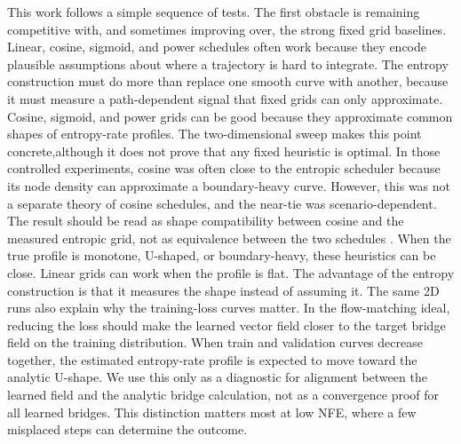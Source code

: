 \documentclass{article}
\theoremstyle{plain}
\theoremstyle{definition}
\theoremstyle{remark}
\begin{document}
This work follows a simple sequence of tests. The first obstacle is remaining competitive with, and sometimes improving over, the strong fixed grid baselines. Linear, cosine, sigmoid, and power schedules often work because they encode plausible assumptions about where a trajectory is hard to integrate. The entropy construction must do more than replace one smooth curve with another, because it must measure a path-dependent signal that fixed grids can only approximate. Cosine, sigmoid, and power grids can be good because they approximate common shapes of entropy-rate profiles. The two-dimensional sweep makes this point concrete,although it does not prove that any fixed heuristic is optimal. In those controlled experiments, cosine was often close to the entropic scheduler because its node density can approximate a boundary-heavy curve. However, this was not a separate theory of cosine schedules, and the near-tie was scenario-dependent. The result should be read as shape compatibility between cosine and the measured entropic grid, not as equivalence between the two schedules \citep{nichol2021improved,karras2022edm,lin2024common}. When the true profile is monotone, U-shaped, or boundary-heavy, these heuristics can be close. Linear grids can work when the profile is flat. The advantage of the entropy construction is that it measures the shape instead of assuming it. The same 2D runs also explain why the training-loss curves matter. In the flow-matching ideal, reducing the loss should make the learned vector field closer to the target bridge field on the training distribution. When train and validation curves decrease together, the estimated entropy-rate profile is expected to move toward the analytic U-shape. We use this only as a diagnostic for alignment between the learned field and the analytic bridge calculation, not as a convergence proof for all learned bridges. This distinction matters most at low NFE, where a few misplaced steps can determine the outcome.

\end{document}
